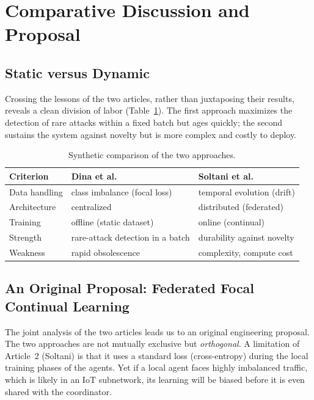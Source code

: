 \documentclass[11pt,a4paper]{article}
\begin{document}
\section{Comparative Discussion and Proposal}

\subsection{Static versus Dynamic}

Crossing the lessons of the two articles, rather than juxtaposing their results, reveals a clean division of labor (Table~\ref{tab:compare}). The first approach maximizes the detection of rare attacks within a fixed batch but ages quickly; the second sustains the system against novelty but is more complex and costly to deploy.

\begin{table}[h]
\centering
\caption{Synthetic comparison of the two approaches.}
\label{tab:compare}
\small
\begin{tabular}{@{}lll@{}}
\toprule
\textbf{Criterion} & \textbf{Dina et al.} & \textbf{Soltani et al.} \\
\midrule
Data handling & class imbalance (focal loss) & temporal evolution (drift) \\
Architecture & centralized & distributed (federated) \\
Training & offline (static dataset) & online (continual) \\
Strength & rare-attack detection in a batch & durability against novelty \\
Weakness & rapid obsolescence & complexity, compute cost \\
\bottomrule
\end{tabular}
\end{table}

\subsection{An Original Proposal: Federated Focal Continual Learning}

The joint analysis of the two articles leads us to an original engineering proposal. The two approaches are not mutually exclusive but \emph{orthogonal}. A limitation of Article~2 (Soltani) is that it uses a standard loss (cross-entropy) during the local training phases of the agents. Yet if a local agent faces highly imbalanced traffic, which is likely in an IoT subnetwork, its learning will be biased before it is even shared with the coordinator.
\end{document}
